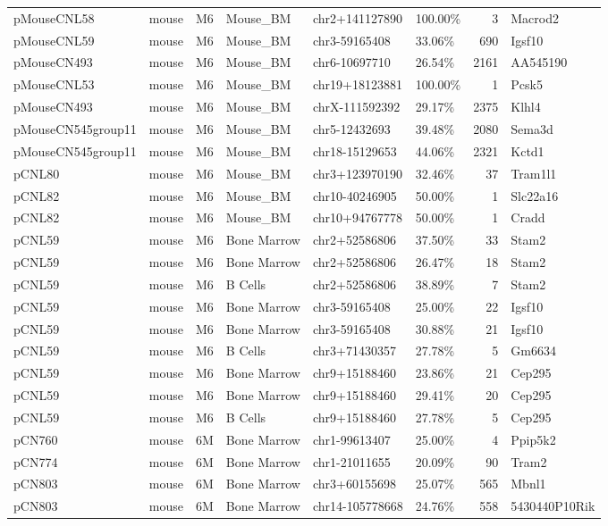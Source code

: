 \documentclass[12pt,]{article}
\begin{document}
\begin{table}[H]
{\begin{tabular}{llllllrl}
pMouseCNL58 & mouse & M6 & Mouse\_BM & chr2+141127890 & 100.00\% & 3 & Macrod2\\
pMouseCNL59 & mouse & M6 & Mouse\_BM & chr3-59165408 & 33.06\% & 690 & Igsf10\\
pMouseCN493 & mouse & M6 & Mouse\_BM & chr6-10697710 & 26.54\% & 2161 & AA545190\\
pMouseCNL53 & mouse & M6 & Mouse\_BM & chr19+18123881 & 100.00\% & 1 & Pcsk5\\
pMouseCN493 & mouse & M6 & Mouse\_BM & chrX-111592392 & 29.17\% & 2375 & Klhl4\\
pMouseCN545group11 & mouse & M6 & Mouse\_BM & chr5-12432693 & 39.48\% & 2080 & Sema3d\\
pMouseCN545group11 & mouse & M6 & Mouse\_BM & chr18-15129653 & 44.06\% & 2321 & Kctd1\\
pCNL80 & mouse & M6 & Mouse\_BM & chr3+123970190 & 32.46\% & 37 & Tram1l1\\
pCNL82 & mouse & M6 & Mouse\_BM & chr10-40246905 & 50.00\% & 1 & Slc22a16\\
pCNL82 & mouse & M6 & Mouse\_BM & chr10+94767778 & 50.00\% & 1 & Cradd\\
pCNL59 & mouse & M6 & Bone Marrow & chr2+52586806 & 37.50\% & 33 & Stam2\\
pCNL59 & mouse & M6 & Bone Marrow & chr2+52586806 & 26.47\% & 18 & Stam2\\
pCNL59 & mouse & M6 & B Cells & chr2+52586806 & 38.89\% & 7 & Stam2\\
pCNL59 & mouse & M6 & Bone Marrow & chr3-59165408 & 25.00\% & 22 & Igsf10\\
pCNL59 & mouse & M6 & Bone Marrow & chr3-59165408 & 30.88\% & 21 & Igsf10\\
pCNL59 & mouse & M6 & B Cells & chr3+71430357 & 27.78\% & 5 & Gm6634\\
pCNL59 & mouse & M6 & Bone Marrow & chr9+15188460 & 23.86\% & 21 & Cep295\\
pCNL59 & mouse & M6 & Bone Marrow & chr9+15188460 & 29.41\% & 20 & Cep295\\
pCNL59 & mouse & M6 & B Cells & chr9+15188460 & 27.78\% & 5 & Cep295\\
pCN760 & mouse & 6M & Bone Marrow & chr1-99613407 & 25.00\% & 4 & Ppip5k2\\
pCN774 & mouse & 6M & Bone Marrow & chr1-21011655 & 20.09\% & 90 & Tram2\\
pCN803 & mouse & 6M & Bone Marrow & chr3+60155698 & 25.07\% & 565 & Mbnl1\\
pCN803 & mouse & 6M & Bone Marrow & chr14-105778668 & 24.76\% & 558 & 5430440P10Rik\\
\bottomrule
\end{tabular}}
\end{table}
\end{document}
